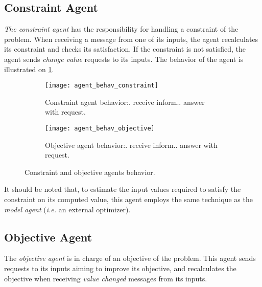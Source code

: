
\subsection{Constraint Agent}
 \emph{The constraint agent} has the responsibility for handling a constraint of the problem. When receiving a message from one of its inputs, the agent recalculates its constraint and checks its satisfaction. If the constraint is not satisfied, the agent sends \emph{change value} requests to its inputs. The behavior of the agent is illustrated on \figurename{} \ref{agent_behav_constraint}.
 
\begin{figure}
\centering
\begin{subfigure}{0.3\textwidth}
	\texttt{[image: agent\_behav\_constraint]}
	\caption{Constraint agent behavior:. receive inform.. answer with request.}\label{agent_behav_constraint}
\end{subfigure}
\qquad
\begin{subfigure}{0.3\textwidth}
	\texttt{[image: agent\_behav\_objective]}
	\caption{Objective agent behavior:. receive inform.. answer with request.}\label{agent_behav_objective}
\end{subfigure}
\caption{Constraint and objective agents behavior.}\label{agent_behav_constraint_and_objective}
\end{figure}

It should be noted that, to estimate the input values required to satisfy the constraint on its computed value, this agent employs the same technique as the \emph{model agent} (\textit{i.e.} an external optimizer).

\subsection{Objective Agent}
The \emph{objective agent} is in charge of an objective of the problem. This agent sends requests to its inputs aiming to improve its objective, and recalculates the objective when receiving \emph{value changed} messages from its inputs.


